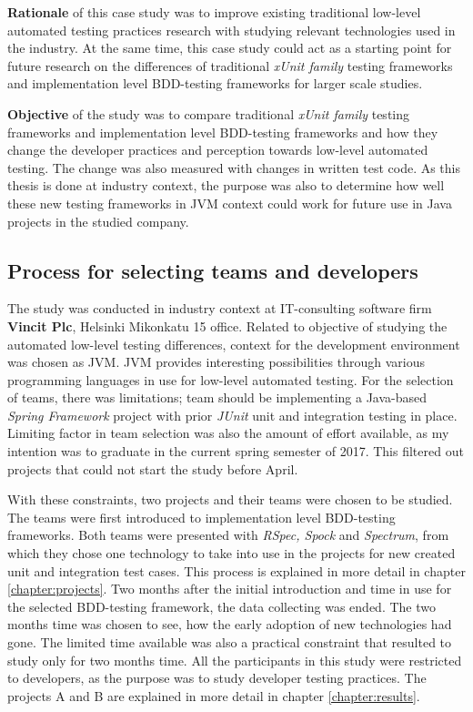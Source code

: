     \textbf{Rationale} of this case study was to improve existing traditional low-level automated testing practices research with studying
    relevant technologies used in the industry. At the same time, this case study could act as a starting point for future
    research on the differences of traditional \textit{xUnit family} testing frameworks and implementation level BDD-testing frameworks for larger
    scale studies.

    \textbf{Objective} of the study was to compare traditional \textit{xUnit family} testing frameworks and implementation level BDD-testing frameworks
    and how they change the developer practices and perception towards low-level automated testing. The change was also measured
    with changes in written test code.
    As this thesis is done at industry context, the purpose was also to determine how well these
    new testing frameworks in JVM context could work for future use in Java projects in the studied company.


\subsection{Process for selecting teams and developers}
    The study was conducted in industry context at IT-consulting software firm \textbf{Vincit Plc}, Helsinki Mikonkatu 15 office.
    Related to objective of studying the automated low-level testing differences, context for the development environment was chosen as JVM.
    JVM provides interesting possibilities through various programming languages in use for low-level automated testing.
    For the selection of teams, there was limitations; team should be implementing a Java-based \textit{Spring Framework} project with prior \textit{JUnit}
    unit and integration testing in place. Limiting factor in team selection was also the amount of effort available,
    as my intention was to graduate in the current spring semester of 2017.  This filtered out projects that could not start
    the study before April.

    With these constraints, two projects and their teams were chosen to be studied. The teams were first introduced to
    implementation level BDD-testing frameworks. Both teams were presented with \textit{RSpec, Spock} and \textit{Spectrum}, from
    which they chose one technology to take into use in the projects for new created unit and integration test cases. This
    process is explained in more detail in chapter \ref{chapter:projects}. Two months after the initial introduction and time in use for
    the selected BDD-testing framework, the data collecting was ended. The two months time was chosen to see, how the early
    adoption of new technologies had gone.
    The limited time available was also a practical constraint that resulted to study only for two months time. All the participants
    in this study were restricted to developers, as the purpose was to study developer testing practices. The projects
    A and B are explained in more detail in chapter \ref{chapter:results}.

